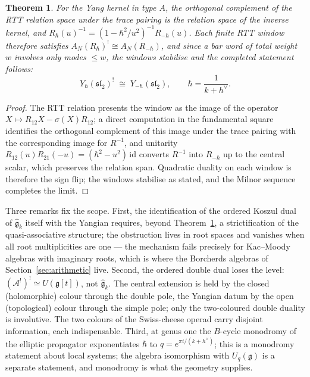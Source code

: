 \documentclass[11pt]{amsart}
\numberwithin{equation}{section}
\theoremstyle{plain}
\newtheorem{theorem}{Theorem}[section]
\theoremstyle{definition}
\theoremstyle{remark}
\newcommand{\cA}{\mathcal{A}}
\newcommand{\fg}{\mathfrak{g}}
\newcommand{\dvee}{h^{\vee}}
\begin{document}
\begin{theorem}\label{thm:yangian}
For the Yang kernel in type $A$, the orthogonal complement of the
RTT relation space under the trace pairing is the relation space of the
inverse kernel, and
$R_{\hbar}(u)^{-1}=(1-\hbar^{2}/u^{2})^{-1}R_{-\hbar}(u)$. Each finite
RTT window therefore satisfies
$A_N(R_{\hbar})^{!}\cong A_N(R_{-\hbar})$, and since a bar word of total
weight $w$ involves only modes $\leq w$, the windows stabilise and the
completed statement follows:
\begin{equation}
Y_{\hbar}(\mathfrak{sl}_2)^{!}\;\cong\;Y_{-\hbar}(\mathfrak{sl}_2),
\qquad \hbar=\frac{1}{k+\dvee}.
\end{equation}
\end{theorem}

\begin{proof}
The RTT relation presents the window as the image of the operator
$X\mapsto R_{12}X-\sigma(X)R_{12}$; a direct computation in the
fundamental square identifies the orthogonal complement of this image
under the trace pairing with the corresponding image for
$R^{-1}$, and unitarity
$R_{12}(u)R_{21}(-u)=(\hbar^{2}-u^{2})\,\mathrm{id}$ converts
$R^{-1}$ into $R_{-\hbar}$ up to the central scalar, which preserves
the relation span. Quadratic duality on each window is therefore the
sign flip; the windows stabilise as stated, and the Milnor sequence
completes the limit.
\end{proof}

Three remarks fix the scope. First, the identification of the ordered
Koszul dual of $\widehat{\fg}_k$ itself with the Yangian requires, beyond
Theorem~\ref{thm:yangian}, a strictification of the quasi-associative
structure; the obstruction lives in root spaces and vanishes when all root
multiplicities are one --- the mechanism fails precisely for Kac--Moody
algebras with imaginary roots, which is where the Borcherds algebras of
Section~\ref{sec:arithmetic} live. Second, the ordered double dual loses
the level: $(\cA^{!})^{!}\simeq U(\fg[t])$, not $\widehat{\fg}_k$. The
central extension is held by the closed (holomorphic) colour through the
double pole, the Yangian datum by the open (topological) colour through
the simple pole; only the two-coloured double duality is involutive. The
two colours of the Swiss-cheese operad carry disjoint information,
each indispensable. Third, at genus one the $B$-cycle
monodromy of the elliptic propagator exponentiates
$\hbar$ to $q=e^{\pi i/(k+\dvee)}$; this is a monodromy statement about
local systems; the algebra isomorphism with $U_q(\fg)$ is a separate
statement, and monodromy is what the geometry supplies.
\end{document}
